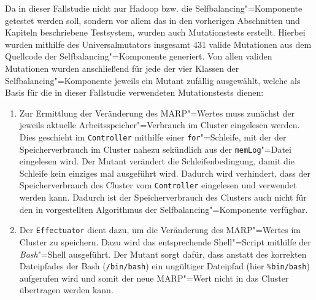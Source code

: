 Da in dieser Fallstudie nicht nur Hadoop bzw. die Selfbalancing"=Komponente getestet werden soll, sondern vor allem das in den vorherigen Abschnitten und Kapiteln beschriebene Testsystem, wurden auch \glspl{Mutationstest} erstellt.
Hierbei wurden mithilfe des Universalmutators insgesamt 431 valide Mutationen aus dem Quellcode der Selfbalancing"=Komponente generiert.
Von allen validen Mutationen wurden anschließend für jede der vier Klassen der Selfbalancing"=Komponente jeweils ein Mutant zufällig ausgewählt, welche als Basis für die in dieser Fallstudie verwendeten \glspl{Mutationstest} dienen:

\begin{enumerate}
    \item
    Zur Ermittlung der Veränderung des \gls{MARP}"=Wertes muss zunächst der jeweils aktuelle Arbeitsspeicher"=Verbrauch im Cluster eingelesen werden.
    Dies geschieht im \texttt{Controller} mithilfe einer \texttt{for}"=Schleife, mit der der Speicherverbrauch im Cluster nahezu sekündlich aus der \texttt{memLog}"=Datei eingelesen wird.
    Der Mutant verändert die Schleifenbedingung, damit die Schleife kein einziges mal ausgeführt wird.
    Dadurch wird verhindert, dass der Speicherverbrauch des Cluster vom \texttt{Controller} eingelesen und verwendet werden kann.
    Dadurch ist der Speicherverbrauch des Clusters auch nicht für den in \cite{Zhang2016} vorgestellten Algorithmus der Selfbalancing"=Komponente verfügbar.
    
    \item 
    Der \texttt{Effectuator} dient dazu, um die Veränderung des \gls{MARP}"=Wertes im Cluster zu speichern.
    Dazu wird das entsprechende Shell"=Script mithilfe der \emph{Bash}"=Shell ausgeführt.
    Der Mutant sorgt dafür, dass anstatt des korrekten Dateipfades der Bash (\texttt{/bin/bash}) ein ungültiger Dateipfad (hier \texttt{\%bin/bash}) aufgerufen wird und somit der neue \gls{MARP}"=Wert nicht in das Cluster übertragen werden kann.
    

\end{enumerate}
